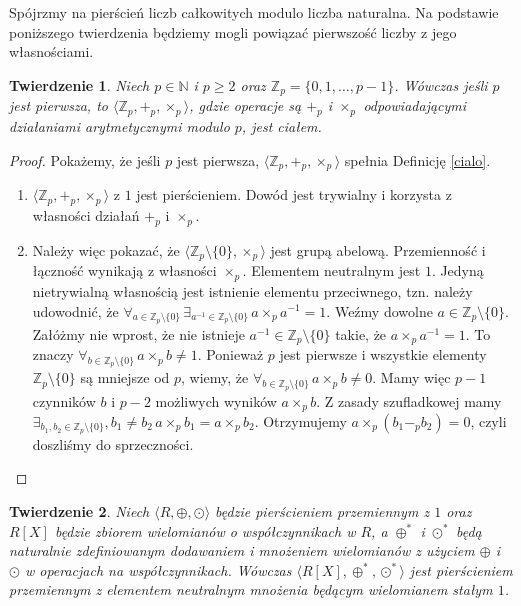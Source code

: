 \documentclass[declaration,shortabstract]{iithesis}
\theoremstyle{definition}
\theoremstyle{remark} \newtheorem{observation}{Obserwacja}
\theoremstyle{plain} \newtheorem{theorem}{Twierdzenie}
\theoremstyle{plain} \newtheorem{lemma}{Lemat}
\theoremstyle{remark} \newtheorem*{remark*}{Uwaga}
\theoremstyle{reminder} \newtheorem*{reminder*}{Przypomnienie}
\begin{document}
Spójrzmy na pierścień liczb całkowitych modulo liczba naturalna. Na podstawie poniższego twierdzenia będziemy mogli powiązać pierwszość liczby z jego własnościami.

\begin{theorem}
	Niech $p \in \mathbb{N}$ i $p \geq 2$ oraz $\mathbb{Z}_p = \{0, 1, \ldots, p-1\}$. Wówczas jeśli $p$ jest pierwsza, to $\langle \mathbb{Z}_p, +_p, \times_p \rangle$, gdzie operacje są $+_p$ i $\times_p$ odpowiadającymi działaniami arytmetycznymi modulo $p$, jest ciałem.
\end{theorem}

\begin{proof}
	Pokażemy, że jeśli $p$ jest pierwsza, $\langle \mathbb{Z}_p, +_p, \times_p \rangle$ spełnia Definicję \ref{cialo}.
	\begin{enumerate}[label=\arabic*.,leftmargin=.4in]
		\item $\langle \mathbb{Z}_p, +_p, \times_p \rangle$ z $1$ jest pierścieniem. Dowód jest trywialny i korzysta z własności działań $+_p$ i $\times_p$.
		\item Należy więc pokazać, że $\langle \mathbb{Z}_p \setminus \{0\}, \times_p \rangle$ jest grupą abelową. Przemienność i łączność wynikają z własności $\times_p$. Elementem neutralnym jest $1$. Jedyną nietrywialną własnością jest istnienie elementu przeciwnego, tzn. należy udowodnić, że $\forall_{a \in \mathbb{Z}_p \setminus \{0\}} \, \exists_{a^{-1} \in \mathbb{Z}_p \setminus \{0\}} \, a \times_p a^{-1} = 1$.\newline
		      Weźmy dowolne $a \in \mathbb{Z}_p \setminus \{0\}$. Załóżmy nie wprost, że nie istnieje $a^{-1} \in \mathbb{Z}_p \setminus \{0\}$ takie, że $a \times_p a^{-1} = 1$. To znaczy $\forall_{b \in \mathbb{Z}_p \setminus \{0\}} \, a \times_p b \neq 1$. Ponieważ $p$ jest pierwsze i wszystkie elementy $\mathbb{Z}_p \setminus \{0\}$ są mniejsze od $p$, wiemy, że $\forall_{b \in \mathbb{Z}_p \setminus \{0\}} \, a \times_p b \neq 0$. Mamy więc $p-1$ czynników $b$ i $p-2$ możliwych wyników $a \times_p b$. Z zasady szufladkowej mamy $\exists_{b_1, b_2 \in \mathbb{Z}_p \setminus \{0\}}, b_1 \neq b_2 \, a \times_p b_1 = a \times_p b_2$. Otrzymujemy $a \times_p (b_1 -_p b_2) = 0$, czyli doszliśmy do sprzeczności.
	\end{enumerate}
\end{proof}

\begin{theorem}
	Niech $\langle R, \oplus, \odot \rangle$ będzie pierścieniem przemiennym z $1$ oraz $R[X]$ będzie zbiorem wielomianów o współczynnikach w $R$, a $\oplus^*$ i $\odot^*$ będą naturalnie zdefiniowanym dodawaniem i mnożeniem wielomianów z użyciem $\oplus$ i $\odot$ w operacjach na współczynnikach. Wówczas
	$\langle R[X], \oplus^{*}, \odot^{*} \rangle$ jest pierścieniem przemiennym z elementem neutralnym mnożenia będącym wielomianem stałym $1$.
\end{theorem}
\end{document}
